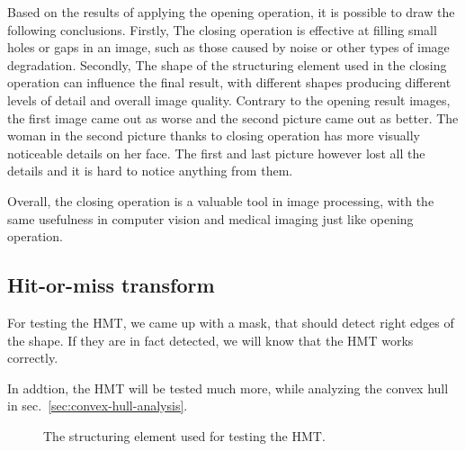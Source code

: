 \documentclass[12pt]{article}
\begin{document}
Based on the results of applying the opening operation, it is possible to draw the following conclusions. Firstly, The closing operation is effective at filling small holes or gaps in an image, such as those caused by noise or other types of image degradation. Secondly, The shape of the structuring element used in the closing operation can influence the final result, with different shapes producing different levels of detail and overall image quality. Contrary to the opening result images, the first image came out as worse and the second picture came out as better. The woman in the second picture thanks to closing operation has more visually noticeable details  on her face. The first and last picture however lost all the details and it is hard to notice anything from them.

Overall, the closing operation is a valuable tool in image processing, with the same usefulness in computer vision and medical imaging just like opening operation.
\subsection{Hit-or-miss transform}

For testing the HMT, we came up with a mask, that should detect right edges of the shape.
If they are in fact detected, we will know that the HMT works correctly.

In addtion, the HMT will be tested much more, while analyzing the convex hull in sec.~\ref{sec:convex-hull-analysis}.

\begin{figure}[H]\centering
    \caption{The structuring element used for testing the HMT.}
\end{figure}
\end{document}
